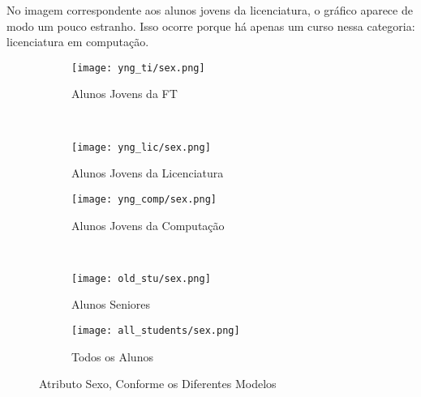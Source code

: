 No imagem correspondente aos alunos jovens da licenciatura, o gráfico aparece de modo
um pouco estranho. Isso ocorre porque há apenas um curso nessa categoria:
licenciatura em computação. 

\clearpage
\begin{figure}[!ht]
    \centering
    \begin{subfigure}[b]{0.48\textwidth}
        \centering
        \texttt{[image: yng\_ti/sex.png]}
        \caption{Alunos Jovens da FT}
    \end{subfigure}
    ~
    \begin{subfigure}[b]{0.48\textwidth}
        \centering
        \texttt{[image: yng\_lic/sex.png]}
        \caption{Alunos Jovens da Licenciatura}
    \end{subfigure}

    \begin{subfigure}[b]{0.48\textwidth}
        \centering
        \texttt{[image: yng\_comp/sex.png]}
        \caption{Alunos Jovens da Computação}
    \end{subfigure}
    ~
    \begin{subfigure}[b]{0.48\textwidth}
        \centering
        \texttt{[image: old\_stu/sex.png]}
        \caption{Alunos Seniores}
    \end{subfigure}

    \begin{subfigure}[b]{0.48\textwidth}
        \centering
        \texttt{[image: all\_students/sex.png]}
        \caption{Todos os Alunos}
    \end{subfigure}
    \caption{Atributo Sexo, Conforme os Diferentes Modelos}
\end{figure}

